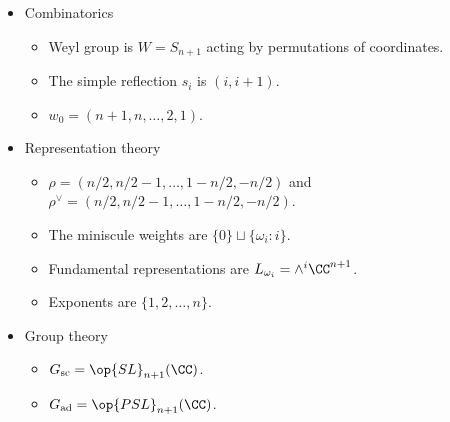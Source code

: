 \documentclass{article}
\begin{document}
\begin{itemize}
\begin{itemize}
		\[\begin{tikzcd}[cramped]
			{\alpha_1} & {\alpha_2} & \cdots & {\alpha_n}
			\arrow[no head, from=1-1, to=1-2]
			\arrow[no head, from=1-2, to=1-3]
			\arrow[no head, from=1-3, to=1-4]
		\end{tikzcd}\]
		\item The fundamental weights are $\{\omega_i\}_i$ where $\omega_i\coloneqq({1,\ldots,1},0,\ldots,0)$ has $i$ ones.
		\item Maximal root $\theta=e_{n+1}-e_n$.
	\end{itemize}
	\item Combinatorics
	\begin{itemize}
		\item Weyl group is $W=S_{n+1}$ acting by permutations of coordinates.
		\item The simple reflection $s_i$ is $(i,i+1)$.
		\item $w_0=(n+1,n,\ldots,2,1)$.
	\end{itemize}
	\item Representation theory
	\begin{itemize}
		\item $\rho=(n/2,n/2-1,\ldots,1-n/2,-n/2)$ and $\rho^\lor=(n/2,n/2-1,\ldots,1-n/2,-n/2)$.
		\item The miniscule weights are $\{0\}\sqcup\{\omega_i:i\}$.
		\item Fundamental representations are $L_{\omega_i}=\land^i\CC^{n+1}$.
		\item Exponents are $\{1,2,\ldots,n\}$.
	\end{itemize}
	\item Group theory
	\begin{itemize}
		\item $G_{\mathrm{sc}}=\op{SL}_{n+1}(\CC)$.
		\item $G_{\mathrm{ad}}=\op{PSL}_{n+1}(\CC)$.
	\end{itemize}
\end{itemize}

\newpage
\end{document}
